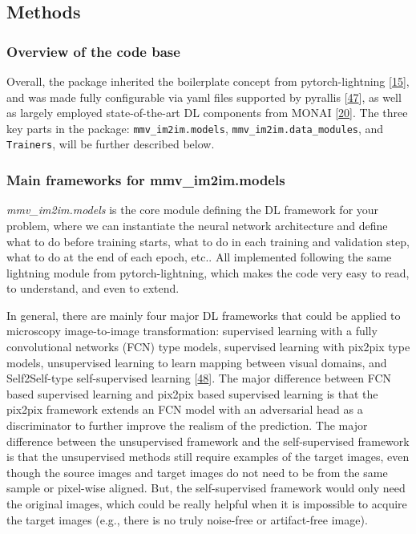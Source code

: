 \hypertarget{methods}{%
\subsection{Methods}\label{methods}}

\hypertarget{overview-of-the-code-base}{%
\subsubsection{Overview of the code base}\label{overview-of-the-code-base}}

Overall, the package inherited the boilerplate concept from pytorch-lightning {[}\protect\hyperlink{ref-YbvSvdyB}{15}{]}, and was made fully configurable via yaml files supported by pyrallis {[}\protect\hyperlink{ref-17WhsEZko}{47}{]}, as well as largely employed state-of-the-art DL components from MONAI {[}\protect\hyperlink{ref-UU62HYC6}{20}{]}. The three key parts in the package: \texttt{mmv\_im2im.models}, \texttt{mmv\_im2im.data\_modules}, and \texttt{Trainers}, will be further described below.

\hypertarget{main-frameworks-for-mmv_im2im.models}{%
\subsubsection{Main frameworks for mmv\_im2im.models}\label{main-frameworks-for-mmv_im2im.models}}

\emph{mmv\_im2im.models} is the core module defining the DL framework for your problem, where we can instantiate the neural network architecture and define what to do before training starts, what to do in each training and validation step, what to do at the end of each epoch, etc.. All implemented following the same lightning module from pytorch-lightning, which makes the code very easy to read, to understand, and even to extend.

In general, there are mainly four major DL frameworks that could be applied to microscopy image-to-image transformation: supervised learning with a fully convolutional networks (FCN) type models, supervised learning with pix2pix type models, unsupervised learning to learn mapping between visual domains, and Self2Self-type self-supervised learning {[}\protect\hyperlink{ref-tuObtXMR}{48}{]}. The major difference between FCN based supervised learning and pix2pix based supervised learning is that the pix2pix framework extends an FCN model with an adversarial head as a discriminator to further improve the realism of the prediction. The major difference between the unsupervised framework and the self-supervised framework is that the unsupervised methods still require examples of the target images, even though the source images and target images do not need to be from the same sample or pixel-wise aligned. But, the self-supervised framework would only need the original images, which could be really helpful when it is impossible to acquire the target images (e.g., there is no truly noise-free or artifact-free image).

